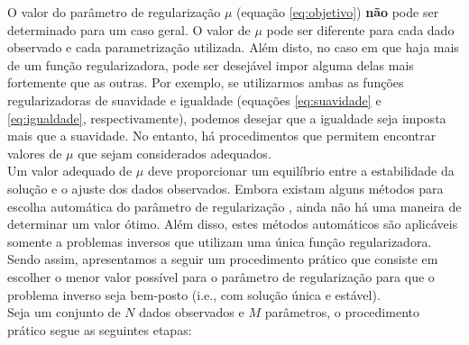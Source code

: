 O valor do parâmetro de regularização $\mu$ (equação \ref{eq:objetivo}) {\bf não}
pode ser determinado para um caso geral.
O valor de $\mu$ pode ser diferente para cada dado observado e cada parametrização
utilizada.
Além disto, no caso em que haja mais de um função regularizadora, pode ser
desejável impor alguma delas mais fortemente que as outras.
Por exemplo, se utilizarmos ambas as funções regularizadoras de
suavidade e igualdade (equações \ref{eq:suavidade} e \ref{eq:igualdade},
respectivamente),
podemos desejar que a igualdade seja imposta mais que a
suavidade. No entanto, há procedimentos que permitem encontrar valores de $\mu$
que sejam considerados adequados. 
\\
\indent Um valor adequado de $\mu$ deve proporcionar um equilíbrio entre
a estabilidade da solução e o ajuste dos dados observados.
Embora existam alguns métodos para escolha automática do parâmetro de regularização
\citep{aster}, ainda não há uma maneira de determinar um valor ótimo.
Além disso, estes métodos automáticos são aplicáveis somente a problemas inversos
que utilizam uma única função regularizadora.
Sendo assim, apresentamos a seguir um procedimento prático que consiste em escolher o
menor valor possível para o parâmetro de regularização para que o problema
inverso seja bem-posto (i.e., com solução única e estável).
\\
\indent Seja um conjunto de $N$ dados observados e $M$ parâmetros,
o procedimento prático segue as seguintes etapas:

